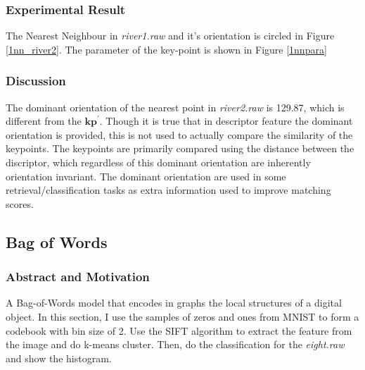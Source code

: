 \documentclass[11pt]{article}
\newcommand{\vct}[1]{\bm{#1}}
\begin{document}
\subsubsection{Experimental Result}
The Nearest Neighbour in {\it river1.raw} and it's orientation is circled in Figure \ref{1nn_river2}. The parameter of the key-point is shown in Figure \ref{1nnpara}

	
\subsubsection{Discussion}

The dominant orientation of the nearest point in {\it river2.raw} is 129.87, which is different from the $\vct {kp}^{ ' }$. Though it is true that in descriptor feature the dominant orientation is provided, this is not used to actually compare the similarity of the keypoints. The keypoints are primarily compared using the distance between the discriptor, which regardless of this dominant orientation are inherently orientation invariant. The dominant orientation are used in some retrieval/classification tasks as extra information used to improve matching scores.


\subsection{Bag of Words}
\subsubsection{Abstract and Motivation}
A Bag-of-Words model that encodes in graphs the local structures of a digital object. In this section, I use the samples of zeros and ones from MNIST to form a codebook with bin size of 2. Use the SIFT algorithm to extract the feature from the image and do k-means cluster. Then, do the classification for the {\it eight.raw} and show the histogram.
\end{document}
